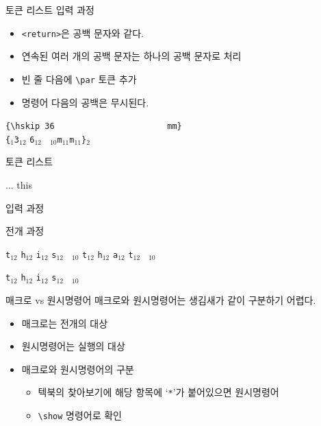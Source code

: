 \documentclass{beamer}
\begin{document}
%
\begin{frame}[fragile]{토큰 리스트}
  \alert{입력 과정}

  \begin{itemize}
  \item \verb+<return>+은 공백 문자와 같다.
  \item 연속된 여러 개의 공백 문자는 하나의 공백 문자로 처리
  \item 빈 줄 다음에 \verb+\par+ 토큰 추가
  \item 명령어 다음의 공백은 무시된다.
  \end{itemize}
  
  \verb*+{\hskip 36                       mm}+\\
  \bigskip
  \verb|{|$_1$\quad{}\quad\verb|3|$_{12}$
  \quad\verb|6|$_{12}$\quad
  \verb*| |$_{10}$\quad\verb|m|$_{11}$\quad\verb|m|$_{11}$\quad\verb|}|$_{2}$
\end{frame}


%
\begin{frame}[fragile]{토큰 리스트}
  \begin{Verbatim*}
\def\tokentwo{\iftrue this \else that \fi}
...
\tokentwo
  \end{Verbatim*}
  
  \bigskip
  \alert{입력 과정}
  
  
  \bigskip
  \alert{전개 과정}
  
  \quad
  \verb|t|$_{12}$\quad
  \verb|h|$_{12}$\quad
  \verb|i|$_{12}$\quad
  \verb|s|$_{12}$\quad
  \verb*| |$_{10}$\quad
  \quad
  \verb|t|$_{12}$\quad
  \verb|h|$_{12}$\quad
  \verb|a|$_{12}$\quad
  \verb|t|$_{12}$\quad
  \verb*| |$_{10}$\quad
  
  \bigskip
  \verb|t|$_{12}$\quad
  \verb|h|$_{12}$\quad
  \verb|i|$_{12}$\quad
  \verb|s|$_{12}$\quad
  \verb*| |$_{10}$\quad
\end{frame}


%
\begin{frame}[fragile]{매크로 vs 원시명령어}
  매크로와 원시명령어는 생김새가 같이 구분하기 어렵다.
  \begin{itemize}
  \item 매크로는 \alert{전개}의 대상
  \item 원시명령어는 \alert{실행}의 대상
  \item 매크로와 원시명령어의 구분
    \begin{itemize}
    \item 텍북의 찾아보기에 해당 항목에 `\verb+*+'가 붙어있으면 원시명령어
    \item \verb+\show+ 명령어로 확인
    \end{itemize}
  \end{itemize}
\end{frame}
\end{document}
